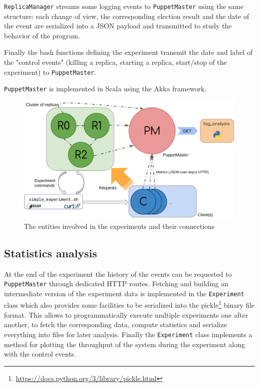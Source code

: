 \documentclass[a4paper, 10pt]{article}
\begin{document}
\texttt{ReplicaManager} streams some logging events to \texttt{PuppetMaster} using the same structure: each change of view, the corresponding election result and the date of the event are serialized into a JSON payload and transmitted to study the behavior of the program.

Finally the bash functions defining the experiment transmit the date and label of the "control events" (killing a replica, starting a replica, start/stop of the experiment) to \texttt{PuppetMaster}.

\texttt{PuppetMaster} is implemented in Scala using the Akka framework.

 \begin{figure}[H]
  \centering
  \label{setup}
  \caption{The entities involved in the experiments and their connections}
  \includegraphics[width=\textwidth]{infrastructure.png}
\end{figure}

\subsection{Statistics analysis}
At the end of the experiment the history of the events can be requested to \texttt{PuppetMaster} through dedicated HTTP routes. Fetching and building an intermediate version of the experiment data is implemented in the \texttt{Experiment} class which also provides some facilities to be serialized into the pickle\footnote{\url{https://docs.python.org/3/library/pickle.html}} binary file format. This allows to programmatically execute multiple experiments one after another, to fetch the corresponding data, compute statistics and serialize everything into files for later analysis. Finally the \texttt{Experiment} class implements a method for plotting the throughput of the system during the experiment along with the control events.
\end{document}
